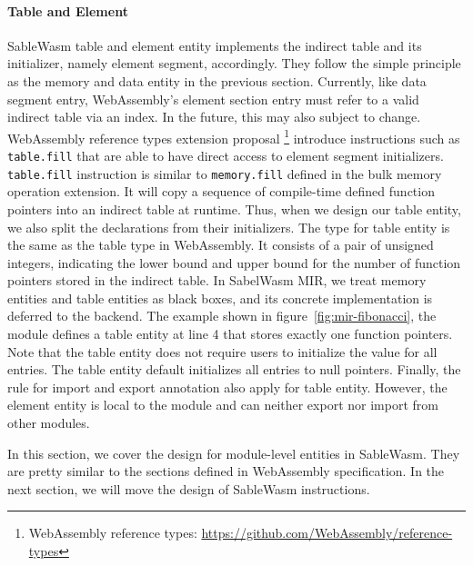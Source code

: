 \paragraph{Table and Element} SableWasm table and element entity implements the indirect table and its initializer, namely element segment, accordingly. They follow the simple principle as the memory and data entity in the previous section. Currently, like data segment entry, WebAssembly's element section entry must refer to a valid indirect table via an index. In the future, this may also subject to change. WebAssembly reference types extension proposal \footnote{WebAssembly reference types: \url{https://github.com/WebAssembly/reference-types}} introduce instructions such as \texttt{table.fill} that are able to have direct access to element segment initializers. \texttt{table.fill} instruction is similar to \texttt{memory.fill} defined in the bulk memory operation extension. It will copy a sequence of compile-time defined function pointers into an indirect table at runtime. Thus, when we design our table entity, we also split the declarations from their initializers. The type for table entity is the same as the table type in WebAssembly. It consists of a pair of unsigned integers, indicating the lower bound and upper bound for the number of function pointers stored in the indirect table. In SabelWasm MIR, we treat memory entities and table entities as black boxes, and its concrete implementation is deferred to the backend. The example shown in figure~\ref{fig:mir-fibonacci}, the module defines a table entity at line 4 that stores exactly one function pointers. Note that the table entity does not require users to initialize the value for all entries. The table entity default initializes all entries to null pointers. Finally, the rule for import and export annotation also apply for table entity. However, the element entity is local to the module and can neither export nor import from other modules.

In this section, we cover the design for module-level entities in SableWasm. They are pretty similar to the sections defined in WebAssembly specification. In the next section, we will move the design of SableWasm instructions.